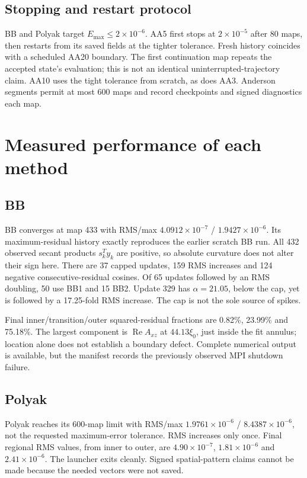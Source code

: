 \documentclass[11pt,a4paper]{article}
\begin{document}
\subsection{Stopping and restart protocol}
BB and Polyak target $E_{\max}\leq2\times10^{-6}$. AA5 first stops at
$2\times10^{-5}$ after 80 maps, then restarts from its saved fields at the
tighter tolerance. Fresh history coincides with a scheduled AA20 boundary.
The first continuation map repeats the accepted state's evaluation; this is
not an identical uninterrupted-trajectory claim. AA10 uses the tight
tolerance from scratch, as does AA3. Anderson segments permit at most 600 maps and record
checkpoints and signed diagnostics each map.

\clearpage
\section{Measured performance of each method}
\subsection{BB}
BB converges at map 433 with RMS/max $4.0912\times10^{-7}$ /
$1.9427\times10^{-6}$. Its maximum-residual history exactly reproduces the
earlier scratch BB run. All 432 observed secant products $s_k^Ty_k$ are
positive, so absolute curvature does not alter their sign here. There are
37 capped updates, 159 RMS increases and 124 negative consecutive-residual
cosines. Of 65 updates followed by an RMS doubling, 50 use BB1 and 15 BB2.
Update 329 has $\alpha=21.05$, below the cap, yet is followed by a 17.25-fold
RMS increase. The cap is not the sole source of spikes.

Final inner/transition/outer squared-residual fractions are 0.82\%, 23.99\%
and 75.18\%. The largest component is $\operatorname{Re}A_{xz}$ at
$44.13\xi_0$, just inside the fit annulus; location alone does not establish
a boundary defect. Complete numerical output is available, but the manifest
records the previously observed MPI shutdown failure.

\subsection{Polyak}
Polyak reaches its 600-map limit with RMS/max $1.9761\times10^{-6}$ /
$8.4387\times10^{-6}$, not the requested maximum-error tolerance. RMS
increases only once. Final regional RMS values, from inner to outer, are
$4.90\times10^{-7}$, $1.81\times10^{-6}$ and $2.41\times10^{-6}$.
The launcher exits cleanly. Signed spatial-pattern claims cannot be made
because the needed vectors were not saved.
\end{document}

